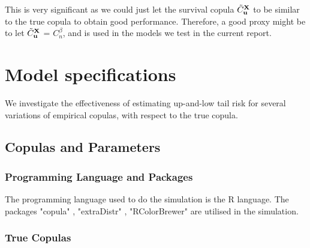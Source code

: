 \documentclass[12pt]{report}
\newcommand{\1}{\mathbf{1}}
\begin{document}
\begin{flushleft}
This is very significant as we could just let the survival copula $\Tilde{C}^{\textbf{X}}_{\textbf{u}}$ to be similar to the true copula to obtain good performance. Therefore, a good proxy might be to let $\Tilde{C}^{\textbf{X}}_{\textbf{u}}$ = $C_{n}^{\beta}$, and is used in the models we test in the current report.

\newpage
\section{Model specifications}
\vspace{0.5cm}
We investigate the effectiveness of estimating up-and-low tail risk for several variations of empirical copulas, with respect to the true copula. \\
\vspace{0.5cm}
\subsection{Copulas and Parameters}
\vspace{0.5cm}
\subsubsection{Programming Language and Packages}

The programming language used to do the simulation is the R language. The packages "copula" \parencite{copulaRPackage2023}, "extraDistr" \parencite{extraDistrRPackage2023}, "RColorBrewer" \parencite{RColorBrewerRPackage2022} are utilised in the simulation.

\subsubsection{True Copulas}


\end{flushleft}
\end{document}
